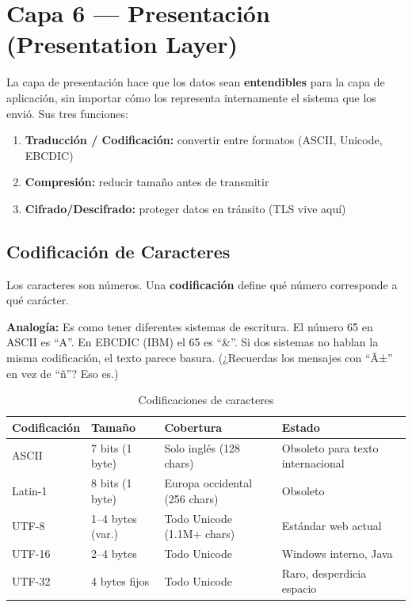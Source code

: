 \chapter{ Capa 6 --- Presentación (Presentation Layer)}

\begin{concepto}
La capa de presentación hace que los datos sean \textbf{entendibles} para la
capa de aplicación, sin importar cómo los representa internamente el sistema
que los envió. Sus tres funciones:
\begin{enumerate}
    \item \textbf{Traducción / Codificación:} convertir entre formatos (ASCII, Unicode, EBCDIC)
    \item \textbf{Compresión:} reducir tamaño antes de transmitir
    \item \textbf{Cifrado/Descifrado:} proteger datos en tránsito (TLS vive aquí)
\end{enumerate}
\end{concepto}

\section{ Codificación de Caracteres}

\begin{concepto}
Los caracteres son números. Una \textbf{codificación} define qué número
corresponde a qué carácter.

 \textbf{Analogía:} Es como tener diferentes sistemas de
escritura. El número 65 en ASCII es ``A''. En EBCDIC (IBM) el 65 es ``\&''.
Si dos sistemas no hablan la misma codificación, el texto parece basura.
(¿Recuerdas los mensajes con ``Ã±'' en vez de ``ñ''? Eso es.)
\end{concepto}

\begin{table}[h!]
\centering
\renewcommand{\arraystretch}{1.4}
\begin{tabular}{llll}
\toprule
\textbf{Codificación} & \textbf{Tamaño} & \textbf{Cobertura} & \textbf{Estado} \\
\midrule
ASCII    & 7 bits (1 byte)    & Solo inglés (128 chars)      & Obsoleto para texto internacional \\
Latin-1  & 8 bits (1 byte)    & Europa occidental (256 chars) & Obsoleto \\
UTF-8    & 1--4 bytes (var.)  & Todo Unicode (1.1M+ chars)   & Estándar web actual \\
UTF-16   & 2--4 bytes         & Todo Unicode                  & Windows interno, Java \\
UTF-32   & 4 bytes fijos      & Todo Unicode                  & Raro, desperdicia espacio \\
\bottomrule
\end{tabular}
\caption{Codificaciones de caracteres}
\end{table}

